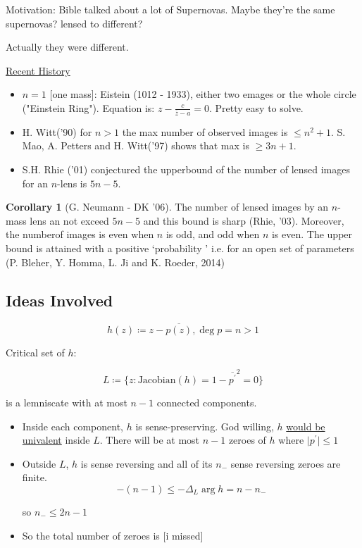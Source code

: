 \documentclass{article}
\theoremstyle{definition}
\newtheorem{corollary}[theorem]{Corollary}
\begin{document}
Motivation: Bible talked about a lot of Supernovas. Maybe they're the same supernovas? lensed to different?

Actually they were different.

\underline{Recent History}

\begin{itemize}
    \item \(n = 1\) [one mass]: Eistein (1012 - 1933), either two emages or the whole circle ("Einstein Ring"). Equation is: \(z - \frac{c}{\overline{z} - a} = 0\). Pretty easy to solve.
    \item H. Witt('90) for \(n > 1\) the max number of observed images is \(\leq n^2 + 1\). S. Mao, A. Petters and H. Witt('97) shows that max is \(\geq 3n + 1\).
    \item S.H. Rhie ('01) conjectured the upperbound of the number of lensed images for an \(n\)-lens is \(5n - 5\).
\end{itemize}

\begin{corollary}
    [G. Neumann - DK '06] The number of lensed images by an \(n\)-mass lens an not exceed \(5n - 5\) and this bound is sharp (Rhie, '03). Moreover, the numberof images is even when \(n\) is odd, and odd when \(n\) is even. The upper bound is attained with a positive `probability ' i.e. for an open set of parameters (P. Bleher, Y. Homma, L. Ji and K. Roeder, 2014)
\end{corollary}

\subsection*{Ideas Involved}

\[
    h(z) \coloneqq z - \overline{p(z)}, \deg p = n > 1
\]

Critical set of \(h\):

\[
    L \coloneqq \{ z : \text{Jacobian}(h) = 1 - \overline{p^{\prime} } ^2 = 0  \}
\]

is a lemniscate with at most \(n-1\) connected components.

\begin{itemize}
    \item Inside each component, \(h\) is sense-preserving. God willing, \(h\) \underline{would be univalent} inside \(L\). There will be at most \(n-1\) zeroes of \(h\) where \(\vert p^{\prime}  \vert \leq 1\)
    \item Outside \(L\), \(h\) is sense reversing and all of its \(n_-\) sense reversing zeroes are finite.
          \[
              - (n-1) \leq - \Delta _L \operatorname{arg}h = n - n_-
          \]

          so \(n_- \leq 2n - 1\)

    \item So the total number of zeroes is [i missed]
\end{itemize}
\end{document}
